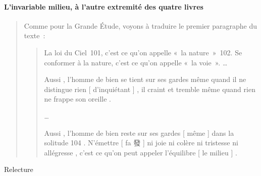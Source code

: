 \paragraph{L'invariable milieu, à l'autre extremité des quatre livres}
 \begin{quote}
Comme pour la Grande Étude, voyons à traduire le premier paragraphe du texte :
\begin{quote}
La loi du Ciel 101, c’est ce qu’on appelle « la nature » 102. Se conformer à la nature, c’est ce qu’on appelle « la voie ».
\ldots

   Aussi , l'homme de bien se tient sur ses gardes même quand il ne
distingue rien {[} d'inquiétant {]} , il craint et tremble même quand
rien ne frappe son oreille . 
 
\ldots

Aussi , l'homme de bien reste sur ses gardes {[} même {]} dans la
solitude 104 . N'émettre {[} fa 發 {]} ni joie ni colère ni tristesse ni
allégresse , c'est ce qu'on peut appeler l'équilibre {[} le milieu {]} .

\end{quote} 
\end{quote}

Relecture

